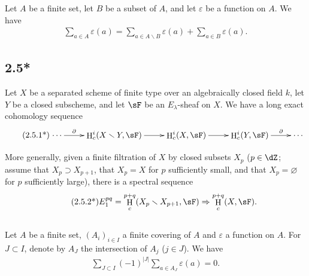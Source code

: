 \documentclass[oneside]{book}
\DeclareMathOperator{\h}{H}
\renewcommand{\setminus}{\smallsetminus}
\theoremstyle{sga-source}
\theoremstyle{sga-source-dash}
\theoremstyle{sga-source-dotdash}
\theoremstyle{sga-source-number-note-dash}
\theoremstyle{sga-source-note-number-dotdash}
\theoremstyle{sga-source-example-dotdash}
\theoremstyle{sga-source-inline-number}
\theoremstyle{sga-source-bare-number}
\theoremstyle{sga-source}
\newcommand{\PrintPage}[1]{}\newcommand{\MathPage}[1]{}\newcommand{\PrintCite}[2]{#1}\newcommand{\var}[3]{#1}
\begin{document}
Let $A$ be a finite set, let $B$ be a subset of $A$, and let $\varepsilon$ be a 
function on $A$. We have 
\begin{align*}\tag{2.5.1}\label{VI:2-5-1}
  \sum_{a\in A} \varepsilon(a) = \sum_{a\in A\setminus B}\varepsilon(a) + \sum_{a\in B} \varepsilon(a) \text{.}
\end{align*}





\subsection*{2.5*}\label{VI:2-5*}

Let $X$ be a separated scheme of finite type over an algebraically closed field $k$, 
let $Y$ be a closed subscheme, and let $\sF$ be an $E_\lambda$-sheaf on $X$. We have 
a long exact cohomology sequence 
\begin{align*}\tag{2.5.1*}\label{VI:eq:2-5-1*}
\xymatrix{
  \cdots \ar[r]^-\partial 
    & \h_c^i(X\setminus Y,\sF) \ar[r] 
    & \h_c^i(X,\sF) \ar[r] 
    & \h_c^i(Y,\sF) \ar[r]^-\partial 
    & \cdots 
}
\end{align*}

\PrintPage{186}
More generally, given a finite filtration of $X$ by closed subsets 
$X_p$ ($p\in \dZ$; assume that $X_p\supset X_{p+1}$, that $X_p=X$ 
for $p$ sufficiently small, and that $X_p=\varnothing$ for $p$ sufficiently large), there is a 
spectral sequence 
\begin{align*}\tag{2.5.2*}\label{VI:eq:2-5-2*}
  E_1^{p q} = \h_c^{p+q}(X_p\setminus X_{p+1},\sF) \Rightarrow \h_c^{p+q}(X,\sF) \text{.}
\end{align*}





\subsection{}\label{VI:2-6}

Let $A$ be a finite set, $(A_i)_{i\in I}$ a finite covering of $A$ and 
$\varepsilon$ a function on $A$. For $J\subset I$, denote by $A_J$ 
the intersection of $A_j$ ($j\in J$). We have 
\begin{align*}\tag{2.6.1}\label{VI:eq:2-6-1}
  \sum_{J\subset I} (-1)^{|J|} \sum_{a\in A_J} \varepsilon(a) = 0 \text{.}
\end{align*}
\end{document}
